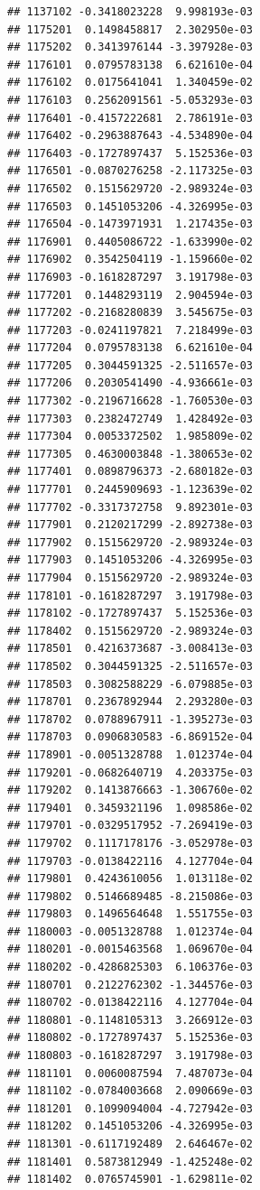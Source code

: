 \begin{frame}[fragile]
\begin{verbatim}
## 1137102 -0.3418023228  9.998193e-03
## 1175201  0.1498458817  2.302950e-03
## 1175202  0.3413976144 -3.397928e-03
## 1176101  0.0795783138  6.621610e-04
## 1176102  0.0175641041  1.340459e-02
## 1176103  0.2562091561 -5.053293e-03
## 1176401 -0.4157222681  2.786191e-03
## 1176402 -0.2963887643 -4.534890e-04
## 1176403 -0.1727897437  5.152536e-03
## 1176501 -0.0870276258 -2.117325e-03
## 1176502  0.1515629720 -2.989324e-03
## 1176503  0.1451053206 -4.326995e-03
## 1176504 -0.1473971931  1.217435e-03
## 1176901  0.4405086722 -1.633990e-02
## 1176902  0.3542504119 -1.159660e-02
## 1176903 -0.1618287297  3.191798e-03
## 1177201  0.1448293119  2.904594e-03
## 1177202 -0.2168280839  3.545675e-03
## 1177203 -0.0241197821  7.218499e-03
## 1177204  0.0795783138  6.621610e-04
## 1177205  0.3044591325 -2.511657e-03
## 1177206  0.2030541490 -4.936661e-03
## 1177302 -0.2196716628 -1.760530e-03
## 1177303  0.2382472749  1.428492e-03
## 1177304  0.0053372502  1.985809e-02
## 1177305  0.4630003848 -1.380653e-02
## 1177401  0.0898796373 -2.680182e-03
## 1177701  0.2445909693 -1.123639e-02
## 1177702 -0.3317372758  9.892301e-03
## 1177901  0.2120217299 -2.892738e-03
## 1177902  0.1515629720 -2.989324e-03
## 1177903  0.1451053206 -4.326995e-03
## 1177904  0.1515629720 -2.989324e-03
## 1178101 -0.1618287297  3.191798e-03
## 1178102 -0.1727897437  5.152536e-03
## 1178402  0.1515629720 -2.989324e-03
## 1178501  0.4216373687 -3.008413e-03
## 1178502  0.3044591325 -2.511657e-03
## 1178503  0.3082588229 -6.079885e-03
## 1178701  0.2367892944  2.293280e-03
## 1178702  0.0788967911 -1.395273e-03
## 1178703  0.0906830583 -6.869152e-04
## 1178901 -0.0051328788  1.012374e-04
## 1179201 -0.0682640719  4.203375e-03
## 1179202  0.1413876663 -1.306760e-02
## 1179401  0.3459321196  1.098586e-02
## 1179701 -0.0329517952 -7.269419e-03
## 1179702  0.1117178176 -3.052978e-03
## 1179703 -0.0138422116  4.127704e-04
## 1179801  0.4243610056  1.013118e-02
## 1179802  0.5146689485 -8.215086e-03
## 1179803  0.1496564648  1.551755e-03
## 1180003 -0.0051328788  1.012374e-04
## 1180201 -0.0015463568  1.069670e-04
## 1180202 -0.4286825303  6.106376e-03
## 1180701  0.2122762302 -1.344576e-03
## 1180702 -0.0138422116  4.127704e-04
## 1180801 -0.1148105313  3.266912e-03
## 1180802 -0.1727897437  5.152536e-03
## 1180803 -0.1618287297  3.191798e-03
## 1181101  0.0060087594  7.487073e-04
## 1181102 -0.0784003668  2.090669e-03
## 1181201  0.1099094004 -4.727942e-03
## 1181202  0.1451053206 -4.326995e-03
## 1181301 -0.6117192489  2.646467e-02
## 1181401  0.5873812949 -1.425248e-02
## 1181402  0.0765745901 -1.629811e-02

\end{verbatim}
\end{frame}

